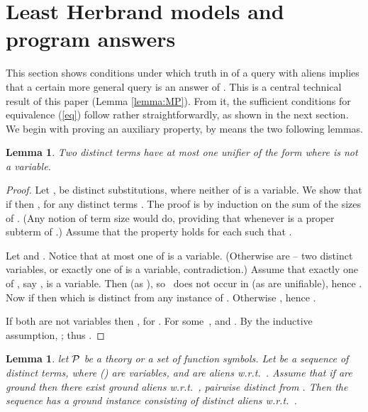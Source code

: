 \documentclass[a4paper]{tlp2}
\newtheorem{lemma}[theorem]{Lemma}
\renewcommand*{\P}{{\ensuremath{\cal P}}\xspace}
\begin{document}
\section{Least Herbrand models and program answers}
\label{sec:main}



This section shows conditions under which
truth in  of a query with aliens implies 
that a certain more general query is an answer of .
This is a central technical result of this paper (Lemma \ref{lemma:MP}).  
From it,
the sufficient conditions for equivalence (\ref{eq}) follow rather
straightforwardly, as shown in the next section.
We begin with proving an auxiliary property, by means the two following lemmas.







\begin{lemma}
\label{lemma:unifier}
Two distinct terms have at most one unifier of the form  where 
is not a variable.  
\end{lemma}

\begin{proof}


Let ,   be distinct substitutions,
where neither of  is a variable.
We show that if  then  , 
for any distinct terms .
The proof is
by induction on the sum  of the sizes of .
(Any notion of term size would do, providing that  whenever  is
a proper subterm of .)
Assume that the
property holds for each   such that .

Let  and .
Notice that at most one of   is a variable.
(Otherwise  are  -- two distinct variables,
 or exactly one of   is a variable, contradiction.)
Assume that exactly one of , say , is a variable.
Then  (as ), so
~does not occur in  (as  are unifiable),
hence .
Now if  then  which is distinct from any instance of
.  Otherwise  , hence .

If both  are not variables then
, for .  For some~, 
and .
By the inductive assumption, 
;
thus .
\end{proof}



\begin{lemma}
\label{lemma:distinct}
let \P be a theory or a set of function symbols.
Let  be a sequence of distinct terms, where  
() are variables, and   are aliens w.r.t.~.
Assume that if   are ground then there exist ground
aliens  w.r.t.\ , pairwise distinct from  .
Then the sequence has
a ground instance  consisting of  distinct aliens
w.r.t.\ . 
\end{lemma}
\nopagebreak
\end{document}
